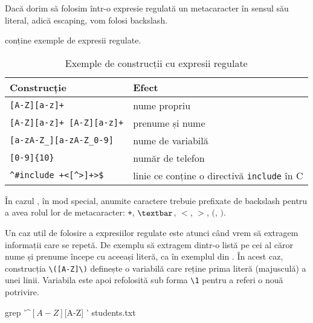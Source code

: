 Dacă dorim să folosim într-o expresie regulată un metacaracter în sensul său literal, adică escaping, vom folosi backslash.

 conține exemple de expresii regulate.

\begin{table}[!htb]
  \caption{Exemple de construcții cu expresii regulate}
  \begin{center}
    \begin{tabular}{ p{} p{} }
      \toprule
        \textbf{Construcție} &
        \textbf{Efect} \\
      \midrule
        \verb|[A-Z][a-z]+| &
        nume propriu \\

        \verb|[A-Z][a-z]+ [A-Z][a-z]+| &
        prenume și nume \\

        \verb|[a-zA-Z_][a-zA-Z_0-9]| &
        nume de variabilă \\

        \verb|[0-9]{10}| &
        număr de telefon \\

        \verb|^#include +<[^>]+>$| &
        linie ce conține o directivă \texttt{include} în C \\

      \bottomrule
    \end{tabular}
    \label{tab:cli:regex-example}
  \end{center}
\end{table}

În cazul , în mod special, anumite caractere trebuie prefixate de backslash
pentru a avea rolul lor de metacaracter: \texttt{+}, \texttt{$\textbar$}, \texttt{$<$}, \texttt{$>$}, \texttt{$($}, \texttt{$)$}.

Un caz util de folosire a expresiilor regulate este atunci când vrem să extragem
informații care se repetă. De exemplu să extragem dintr-o listă pe cei al căror
nume și prenume începe cu aceeași literă, ca în exemplul din . În acest caz, construcția \verb|\([A-Z]\)| definește o variabilă care reține prima literă (majusculă) a unei linii. Variabila este apoi refolosită sub forma \verb|\1| pentru a referi o nouă potrivire.

\begin{screen}[caption={Expresii regulate cu variabile},escapechar=,label={lst:cli:regex-var}]
grep '^\([A-Z]\)[A-Z]\+ \1' students.txt
\end{screen}

